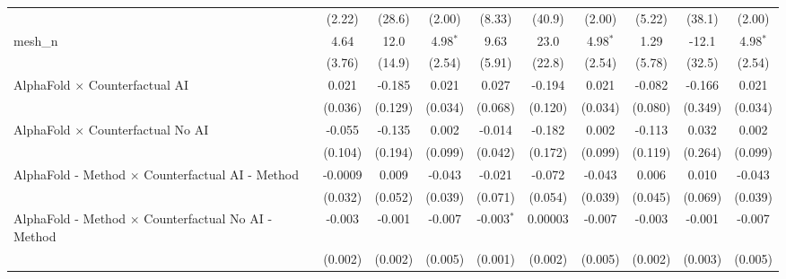 \begin{tabular}{lccccccccc}
                                                               & (2.22)        & (28.6)        & (2.00)        & (8.33)         & (40.9)         & (2.00)        & (5.22)        & (38.1)        & (2.00)\\   
   mesh\_n                                                     & 4.64          & 12.0          & 4.98$^{*}$    & 9.63           & 23.0           & 4.98$^{*}$    & 1.29          & -12.1         & 4.98$^{*}$\\   
                                                               & (3.76)        & (14.9)        & (2.54)        & (5.91)         & (22.8)         & (2.54)        & (5.78)        & (32.5)        & (2.54)\\   
   AlphaFold $\times$ Counterfactual AI                        & 0.021         & -0.185        & 0.021         & 0.027          & -0.194         & 0.021         & -0.082        & -0.166        & 0.021\\   
                                                               & (0.036)       & (0.129)       & (0.034)       & (0.068)        & (0.120)        & (0.034)       & (0.080)       & (0.349)       & (0.034)\\   
   AlphaFold $\times$ Counterfactual No AI                     & -0.055        & -0.135        & 0.002         & -0.014         & -0.182         & 0.002         & -0.113        & 0.032         & 0.002\\   
                                                               & (0.104)       & (0.194)       & (0.099)       & (0.042)        & (0.172)        & (0.099)       & (0.119)       & (0.264)       & (0.099)\\   
   AlphaFold - Method $\times$ Counterfactual AI - Method      & -0.0009       & 0.009         & -0.043        & -0.021         & -0.072         & -0.043        & 0.006         & 0.010         & -0.043\\   
                                                               & (0.032)       & (0.052)       & (0.039)       & (0.071)        & (0.054)        & (0.039)       & (0.045)       & (0.069)       & (0.039)\\   
   AlphaFold - Method $\times$ Counterfactual No AI - Method   & -0.003        & -0.001        & -0.007        & -0.003$^{*}$   & 0.00003        & -0.007        & -0.003        & -0.001        & -0.007\\   
                                                               & (0.002)       & (0.002)       & (0.005)       & (0.001)        & (0.002)        & (0.005)       & (0.002)       & (0.003)       & (0.005)\\   

\end{tabular}
